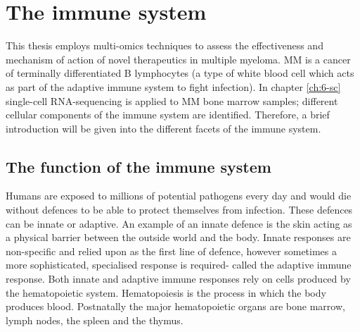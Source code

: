 \section{The immune system}
This thesis employs multi-omics techniques to assess the effectiveness and mechanism of action of novel therapeutics in multiple myeloma.
MM is a cancer of terminally differentiated B lymphocytes (a type of white blood cell which acts as part of the adaptive immune system to fight infection).
In chapter \ref{ch:6-sc} single-cell RNA-sequencing is applied to MM bone marrow samples;
different cellular components of the immune system are identified.
Therefore, a brief introduction will be given into the different facets of the immune system.

\subsection{The function of the immune system}
Humans are exposed to millions of potential pathogens every day and would die without defences to be able to protect themselves from infection.
These defences can be innate or adaptive.
An example of an innate defence is the skin acting as a physical barrier between the outside world and the body.
Innate responses are non-specific and relied upon as the first line of defence, however sometimes a more sophisticated, specialised response is required- called the adaptive immune response\cite{alberts2007molecularimmune}.
Both innate and adaptive immune responses rely on cells produced by the hematopoietic system.
Hematopoiesis is the process in which the body produces blood\cite{alberts2007molecularstem}.
Postnatally the major hematopoietic organs are bone marrow, lymph nodes, the spleen and the thymus.

